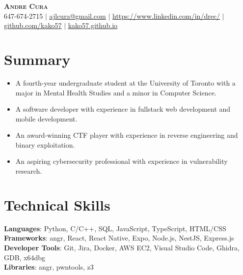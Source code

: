 \documentclass[letterpaper,11pt]{article}
\newcommand{\resumeItem}[1]{
  \item\small{
    {#1 \vspace{-2pt}}
  }
}
\newcommand{\resumeItemListStart}{\begin{itemize}}
\newcommand{\resumeItemListEnd}{\end{itemize}\vspace{-5pt}}
\begin{document}

\begin{center}
  \textbf{\Huge \scshape Andre Cura} \\ \vspace{1pt}
  \small 647-674-2715 $|$ \href{mailto:ajlcura@gmail.com}{\underline{ajlcura@gmail.com}} $|$ 
  \href{https://www.linkedin.com/in/drec/}{\underline{https://www.linkedin.com/in/drec/}} $|$
  \href{https://github.com/kako57}{\underline{github.com/kako57}} $|$
  \href{https://kako57.github.io}{\underline{kako57.github.io}}\\
\end{center}

\section{Summary}
  \begin{itemize}[leftmargin=0.15in, label={}]
    \small{\item{
      \resumeItemListStart
        \resumeItem{A fourth-year undergraduate student at the University of Toronto with a major in Mental Health Studies and a minor in Computer Science.}
        \resumeItem{A software developer with experience in fullstack web development and mobile development.}
        \resumeItem{An award-winning CTF player with experience in reverse engineering and binary exploitation.}
        \resumeItem{An aspiring cybersecurity professional with experience in vulnerability research.}
      \resumeItemListEnd
    }}
  \end{itemize}

\section{Technical Skills}
 \begin{itemize}[leftmargin=0.15in, label={}]
    \small{\item{
      \textbf{Languages}{: Python, C/C++, SQL, JavaScript, TypeScript, HTML/CSS} \\
      \textbf{Frameworks}{: angr, React, React Native, Expo, Node.js, NestJS, Express.js} \\
      \textbf{Developer Tools}{: Git, Jira, Docker, AWS EC2, Visual Studio Code, Ghidra, GDB, x64dbg} \\
      \textbf{Libraries}{: angr, pwntools, z3 }
    }}
 \end{itemize}
\end{document}
